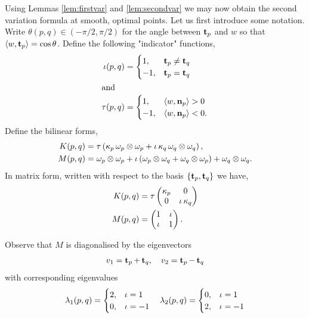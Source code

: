 \documentclass[12pt]{amsart}
\begin{document}
Using Lemmas \ref{lem:firstvar} and \ref{lem:secondvar} we may now obtain the second variation formula at smooth, optimal points. Let us first introduce some notation. Write \(\theta(p,q) \in (-\pi/2, \pi/2)\) for the angle between \(\operatorname{\mathbf{t}}_{p}\) and \(w\) so that \(\langle{w},{\operatorname{\mathbf{t}}_p}\rangle = \cos\theta\). Define the following "indicator" functions,
\begin{align*}
\operatorname{\iota}(p, q) &= \begin{cases}
1,& \operatorname{\mathbf{t}}_{p} \ne \operatorname{\mathbf{t}}_{q} \\
-1,& \operatorname{\mathbf{t}}_{p} = \operatorname{\mathbf{t}}_{q}
\end{cases} \\
\intertext{and}
\operatorname{\tau}(p, q) &= \begin{cases}
1,& \langle{w},{\operatorname{\mathbf{n}}_{p}}\rangle > 0 \\
-1,& \langle{w},{\operatorname{\mathbf{n}}_{p}}\rangle < 0.
\end{cases}
\end{align*}
Define the bilinear forms,
\begin{align*}
K(p, q) &= \operatorname{\tau} \left(\operatorname{\kappa}_p \omega_p \otimes \omega_p + \operatorname{\iota} \operatorname{\kappa}_q \omega_q \otimes \omega_q\right), \\
M(p, q) &= \omega_p \otimes \omega_p + \operatorname{\iota}\left(\omega_p \otimes \omega_q + \omega_q \otimes \omega_p\right) + \omega_q \otimes \omega_q.
\end{align*}
In matrix form, written with respect to the basis \(\{\operatorname{\mathbf{t}}_p, \operatorname{\mathbf{t}}_q\}\) we have,
\begin{align*}
K(p,q) &= \operatorname{\tau}\begin{pmatrix}
\operatorname{\kappa}_{p} & 0 \\
0 & \operatorname{\iota} \operatorname{\kappa}_{q}
\end{pmatrix} \\
M(p,q) &= \begin{pmatrix}
1 & \operatorname{\iota} \\
\operatorname{\iota} & 1
\end{pmatrix}.
\end{align*}

Observe that \(M\) is diagonalised by the eigenvectors
\begin{equation}
\label{eq:eigenvectors}
v_1 = \operatorname{\mathbf{t}}_{p} + \operatorname{\mathbf{t}}_{q}, \quad v_2 = \operatorname{\mathbf{t}}_{p} - \operatorname{\mathbf{t}}_{q}
\end{equation}
with corresponding eigenvalues
\begin{equation}
\label{eq:eigenvalues}
\lambda_1 (p, q) = \begin{cases}
2, & \operatorname{\iota} = 1 \\
0, & \operatorname{\iota} = -1
\end{cases}
\quad
\lambda_2 (p, q) = \begin{cases}
0, & \operatorname{\iota} = 1 \\
2, & \operatorname{\iota} = -1
\end{cases}
\end{equation}
\end{document}

